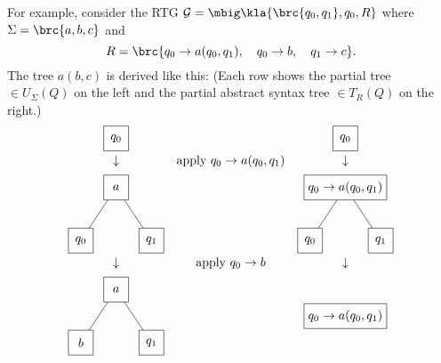 For example, consider the RTG $\ug = \mbig\kla{\brc{q_0,q_1},q_0,R}$ where
$\Sigma=\brc{a,b,c}$ and
\[
 R = \brc{ q_0 \to a(q_0,q_1), \quad q_0 \to b, \quad q_1 \to c }.
\]
The tree $a(b,c)$ is derived like this: (Each row shows the partial tree $\in
U_\Sigma(Q)$ on the left and the partial abstract syntax tree $\in T_R(Q)$ on the
right.)
\[\begin{matrix}
 \begin{tikzpicture}[every node/.style={rectangle,draw,minimum size=2em},baseline=(current bounding box.center)]
  \node (n) at (0,0) { $q_0$ };
 \end{tikzpicture}
 &&
 \begin{tikzpicture}[every node/.style={rectangle,draw,minimum size=2em},baseline=(current bounding box.center)]
  \node (n) at (0,0) { $q_0$ };
 \end{tikzpicture}
 \\\\[-1em]
 \downarrow & \text{apply } q_0\to a(q_0,q_1) & \downarrow \\[0.5em]
 \begin{tikzpicture}[every node/.style={rectangle,draw,minimum size=2em},baseline=(current bounding box.center)]
  \node (n) at (0,0) { $a$ };
  \node (n1) at (-1,-1.5) { $q_0$ } edge (n);
  \node (n2) at (+1,-1.5) { $q_1$ } edge (n);
 \end{tikzpicture}
 &\hspace*{4em}&
 \begin{tikzpicture}[every node/.style={rectangle,draw,minimum size=2em},baseline=(current bounding box.center)]
  \node (n) at (0,0) { $q_0 \to a(q_0,q_1)$ };
  \node (n1) at (-1,-1.5) { $q_0$ } edge (n);
  \node (n2) at (+1,-1.5) { $q_1$ } edge (n);
 \end{tikzpicture}
 \\\\[-1em]
 \downarrow & \text{apply } q_0\to b & \downarrow \\[0.5em]
 \begin{tikzpicture}[every node/.style={rectangle,draw,minimum size=2em},baseline=(current bounding box.center)]
  \node (n) at (0,0) { $a$ };
  \node (n1) at (-1,-1.5) { $b$ } edge (n);
  \node (n2) at (+1,-1.5) { $q_1$ } edge (n);
 \end{tikzpicture}
 &\hspace*{4em}&
 \begin{tikzpicture}[every node/.style={rectangle,draw,minimum size=2em},baseline=(current bounding box.center)]
  \node (n) at (0,0) { $q_0 \to a(q_0,q_1)$ };

\end{tikzpicture}
\end{matrix}\]
